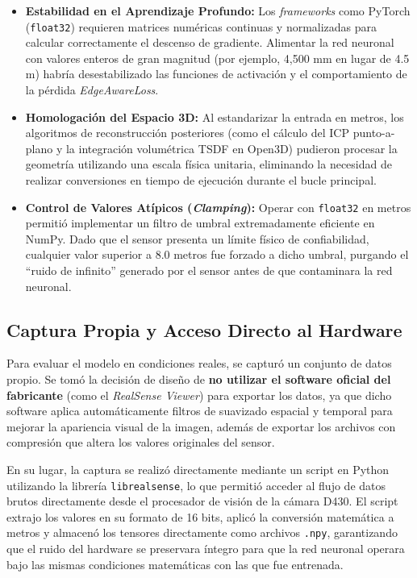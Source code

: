 \documentclass[12pt, a4, twoside, openany]{report}
\begin{document}
\begin{itemize}
    \item \textbf{Estabilidad en el Aprendizaje Profundo:} Los \textit{frameworks} como PyTorch (\texttt{float32}) requieren matrices numéricas continuas y normalizadas para calcular correctamente el descenso de gradiente. Alimentar la red neuronal con valores enteros de gran magnitud (por ejemplo, 4{,}500 mm en lugar de 4.5 m) habría desestabilizado las funciones de activación y el comportamiento de la pérdida \textit{EdgeAwareLoss}.
    \item \textbf{Homologación del Espacio 3D:} Al estandarizar la entrada en metros, los algoritmos de reconstrucción posteriores (como el cálculo del ICP punto-a-plano y la integración volumétrica TSDF en Open3D) pudieron procesar la geometría utilizando una escala física unitaria, eliminando la necesidad de realizar conversiones en tiempo de ejecución durante el bucle principal.
    \item \textbf{Control de Valores Atípicos (\textit{Clamping}):} Operar con \texttt{float32} en metros permitió implementar un filtro de umbral extremadamente eficiente en NumPy. Dado que el sensor presenta un límite físico de confiabilidad, cualquier valor superior a 8.0 metros fue forzado a dicho umbral, purgando el ``ruido de infinito'' generado por el sensor antes de que contaminara la red neuronal.
\end{itemize}

\subsection{Captura Propia y Acceso Directo al Hardware}

Para evaluar el modelo en condiciones reales, se capturó un conjunto de datos propio. Se tomó la decisión de diseño de \textbf{no utilizar el software oficial del fabricante} (como el \textit{RealSense Viewer}) para exportar los datos, ya que dicho software aplica automáticamente filtros de suavizado espacial y temporal para mejorar la apariencia visual de la imagen, además de exportar los archivos con compresión que altera los valores originales del sensor.

En su lugar, la captura se realizó directamente mediante un script en Python utilizando la librería \texttt{librealsense}, lo que permitió acceder al flujo de datos brutos directamente desde el procesador de visión de la cámara D430. El script extrajo los valores en su formato de 16 bits, aplicó la conversión matemática a metros y almacenó los tensores directamente como archivos \texttt{.npy}, garantizando que el ruido del hardware se preservara íntegro para que la red neuronal operara bajo las mismas condiciones matemáticas con las que fue entrenada.
\end{document}

